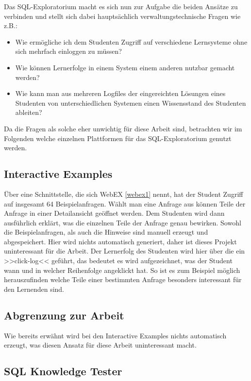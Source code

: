 Das SQL-Exploratorium macht es sich nun zur Aufgabe die beiden Ansätze zu verbinden und stellt sich dabei hauptsächlich verwaltungstechnische Fragen wie z.B.:

\begin{itemize}
\item Wie ermögliche ich dem Studenten Zugriff auf verschiedene Lernsysteme ohne sich mehrfach einloggen zu müssen?
\item Wie können Lernerfolge in einem System einem anderen nutzbar gemacht werden?
\item Wie kann man aus mehreren Logfiles der eingereichten Lösungen eines Studenten von unterschiedlichen Systemen einen Wissensstand des Studenten ableiten?
\end{itemize}

Da die Fragen als solche eher unwichtig für diese Arbeit sind, betrachten wir im Folgenden welche einzelnen Plattformen für das SQL-Exploratorium genutzt werden.

\subsection{Interactive Examples}

Über eine Schnittstelle, die sich WebEX \ref{webex1} nennt, hat der Student Zugriff auf insgesamt 64 Beispielanfragen. Wählt man eine Anfrage aus können Teile der Anfrage in einer Detailansicht geöffnet werden. Dem Studenten wird dann ausführlich erklärt, was die einzelnen Teile der Anfrage genau bewirken. Sowohl die Beispielanfragen, als auch die Hinweise sind manuell erzeugt und abgespeichert. Hier wird nichts automatisch generiert, daher ist dieses Projekt uninteressant für die Arbeit. Der Lernerfolg des Studenten wird hier über die ein >>click-log<< geführt, das bedeutet es wird aufgezeichnet, was der Student wann und in welcher Reihenfolge angeklickt hat. So ist es zum Beispiel möglich herauszufinden welche Teile einer bestimmten Anfrage besonders interessant für den Lernenden sind.

\subsection*{Abgrenzung zur Arbeit}

Wie bereits erwähnt wird bei den Interactive Examples nichts automatisch erzeugt, was diesen Ansatz für diese Arbeit uninteressant macht.

\subsection{SQL Knowledge Tester}

